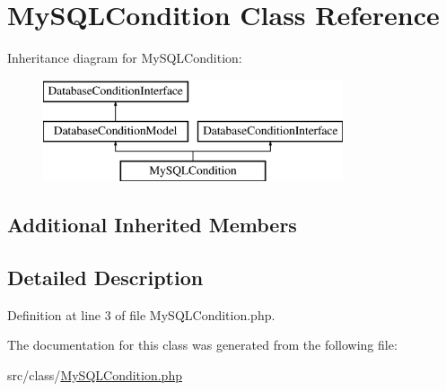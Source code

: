 \hypertarget{class_my_s_q_l_condition}{}\section{My\+S\+Q\+L\+Condition Class Reference}
\label{class_my_s_q_l_condition}
Inheritance diagram for My\+S\+Q\+L\+Condition\+:\begin{figure}[H]
\begin{center}
\leavevmode
\includegraphics[height=3.000000cm]{class_my_s_q_l_condition}
\end{center}
\end{figure}
\subsection*{Additional Inherited Members}


\subsection{Detailed Description}


Definition at line 3 of file My\+S\+Q\+L\+Condition.\+php.



The documentation for this class was generated from the following file\+:\begin{DoxyCompactItemize}
\item 
src/class/\hyperlink{_my_s_q_l_condition_8php}{My\+S\+Q\+L\+Condition.\+php}\end{DoxyCompactItemize}
